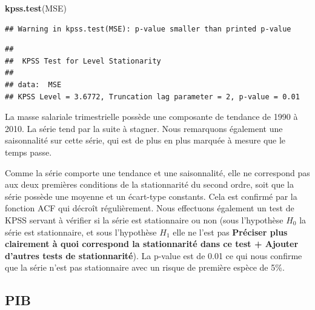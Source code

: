 \documentclass[11pt,]{article}
\newenvironment{Shaded}{\begin{snugshade}}{\end{snugshade}}
\newcommand{\KeywordTok}[1]{\textcolor[rgb]{0.13,0.29,0.53}{\textbf{{#1}}}}
\newcommand{\DataTypeTok}[1]{\textcolor[rgb]{0.13,0.29,0.53}{{#1}}}
\newcommand{\DecValTok}[1]{\textcolor[rgb]{0.00,0.00,0.81}{{#1}}}
\newcommand{\StringTok}[1]{\textcolor[rgb]{0.31,0.60,0.02}{{#1}}}
\newcommand{\NormalTok}[1]{{#1}}
\begin{document}
\begin{Shaded}
\begin{Highlighting}[]
  \KeywordTok{kpss.test}\NormalTok{(MSE)}
\end{Highlighting}
\end{Shaded}

\begin{verbatim}
## Warning in kpss.test(MSE): p-value smaller than printed p-value
\end{verbatim}

\begin{verbatim}
## 
##  KPSS Test for Level Stationarity
## 
## data:  MSE
## KPSS Level = 3.6772, Truncation lag parameter = 2, p-value = 0.01
\end{verbatim}

La masse salariale trimestrielle possède une composante de tendance de
1990 à 2010. La série tend par la suite à stagner. Nous remarquons
également une saisonnalité sur cette série, qui est de plus en plus
marquée à mesure que le temps passe.

Comme la série comporte une tendance et une saisonnalité, elle ne
correspond pas aux deux premières conditions de la stationnarité du
second ordre, soit que la série possède une moyenne et un écart-type
constants. Cela est confirmé par la fonction ACF qui décroît
régulièrement. Nous effectuons également un test de KPSS servant à
vérifier si la série est stationnaire ou non (sous l'hypothèse \(H_{0}\)
la série est stationnaire, et sous l'hypothèse \(H_{1}\) elle ne l'est
pas \textbf{Préciser plus clairement à quoi correspond la stationnarité
dans ce test + Ajouter d'autres tests de stationnarité}). La p-value est
de 0.01 ce qui nous confirme que la série n'est pas stationnaire avec un
risque de première espèce de 5\%.

\subsection{PIB}\label{pib}

\begin{Shaded}
\end{Shaded}
\end{document}

